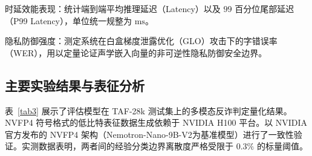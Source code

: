 \documentclass[11pt, a4paper]{article}
\begin{document}
    {时延效能表现}：统计端到端平均推理延迟（Latency）以及 $99$ 百分位尾部延迟（P99 Latency），单位统一规整为 $\mathrm{ms}$。
    
    {隐私防御强度}：测定系统在白盒梯度泄露优化（GLO）攻击下的字错误率（WER），用以定量论证声学嵌入向量的非可逆性隐私防御安全边界。

\subsection{主要实验结果与表征分析}

表~\ref{tab3} 展示了评估模型在 TAF-28k 测试集上的多模态反诈判定量化结果。NVFP4 符号格式的低比特表征数据生成依赖于 NVIDIA H100 平台。以 NVIDIA 官方发布的 NVFP4 架构（Nemotron-Nano-9B-V2为基准模型）进行了一致性验证。实测数据表明，两者间的经验分类边界离散度严格受限于 $0.3\%$ 的标量阈值。
\end{document}
